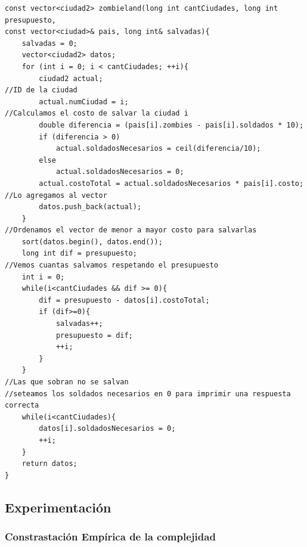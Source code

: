 	
	\begin{codesnippet}
	\begin{verbatim}
const vector<ciudad2> zombieland(long int cantCiudades, long int presupuesto, 
const vector<ciudad>& pais, long int& salvadas){
    salvadas = 0;
    vector<ciudad2> datos;
    for (int i = 0; i < cantCiudades; ++i){
        ciudad2 actual;
//ID de la ciudad
        actual.numCiudad = i;
//Calculamos el costo de salvar la ciudad i
        double diferencia = (pais[i].zombies - pais[i].soldados * 10);
        if (diferencia > 0)
            actual.soldadosNecesarios = ceil(diferencia/10);
        else
            actual.soldadosNecesarios = 0;
        actual.costoTotal = actual.soldadosNecesarios * pais[i].costo;
//Lo agregamos al vector
        datos.push_back(actual);
    }
//Ordenamos el vector de menor a mayor costo para salvarlas
    sort(datos.begin(), datos.end());
    long int dif = presupuesto;
//Vemos cuantas salvamos respetando el presupuesto
    int i = 0;
    while(i<cantCiudades && dif >= 0){
        dif = presupuesto - datos[i].costoTotal;
        if (dif>=0){
            salvadas++;
            presupuesto = dif;
            ++i;
        }
    }
//Las que sobran no se salvan
//seteamos los soldados necesarios en 0 para imprimir una respuesta correcta
    while(i<cantCiudades){
        datos[i].soldadosNecesarios = 0;
        ++i;
    }
    return datos;
}
	\end{verbatim}
	\end{codesnippet}
\newpage
\subsection{Experimentaci\'on}

\subsubsection{Constrastaci\'on Emp\'irica de la complejidad}



 




